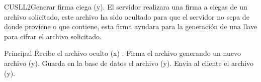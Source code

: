 


\begin{UseCase}{CUSLL2}{Generar firma ciega (y). }{El servidor realizara una firma a ciegas de un archivo solicitado, este archivo ha sido ocultado para que el servidor no sepa de donde proviene o que contiene, esta firma ayudara para la generación de una llave para cifrar el archivo solicitado.}

\end{UseCase}


\begin{UCtrayectoria}{Principal}
	\UCpaso Recibe el archivo oculto (x) .
	\UCpaso Firma el archivo generando un nuevo archivo (y).
	\UCpaso Guarda en la base de datos el archivo (y).
	\UCpaso Envía al cliente el archivo (y).
\end{UCtrayectoria}


		

